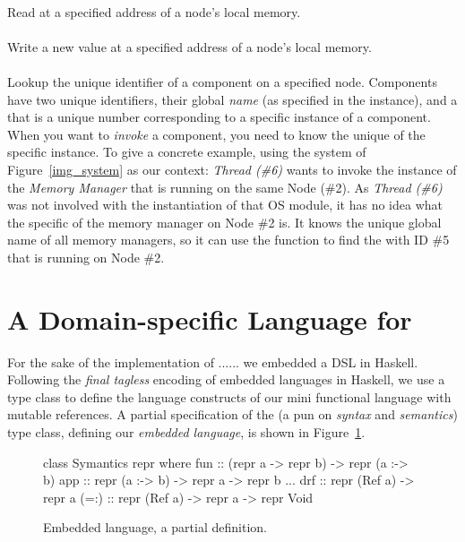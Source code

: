 \paragraph{}
Read at a specified address of a node's local memory.
\paragraph{}
Write a new value at a specified address of a node's local memory.
\paragraph{}
Lookup the unique identifier of a component on a specified node.
Components have two unique identifiers, their global \emph{name} (as specified in the  instance), and a  that
is a unique number corresponding to a specific instance of a component.
When you want to \emph{invoke} a component, you need to know the unique  of the specific instance.
To give a concrete example, using the system of Figure~\ref{img_system} as our context: \emph{Thread (\#6)} wants to invoke the instance of the \emph{Memory Manager} that is running on the same Node (\#2).
As \emph{Thread (\#6)} was not involved with the instantiation of that OS module, it has no idea what the specific  of the memory manager on Node \#2 is.
It knows the unique global name of all memory managers, so it can use the  function to find the  with ID \#5 that is running on Node \#2.

\section{A Domain-specific Language for \soosim}
\label{sec:dsl}

For the sake of the implementation of ...... we embedded a DSL in Haskell. 
Following the \emph{final tagless} \cite{final_tagless_embedding} encoding of embedded languages in Haskell, we use a type class to define the language constructs of our mini functional language with mutable references.
A partial specification of the  (a pun on \emph{syntax} and \emph{semantics}) type class, defining our \emph{embedded language}, is shown in Figure~\ref{fig:embedded_language_interface}.

\begin{figure}
\centering
\begin{code}
class Symantics repr where
  fun  :: (repr a -> repr b) -> repr (a :-> b)
  app  :: repr (a :-> b) -> repr a -> repr b
  ...
  drf   :: repr (Ref a) -> repr a
  (=:)  :: repr (Ref a) -> repr a -> repr Void
\end{code}
\caption{Embedded language, a partial definition.}
\label{fig:embedded_language_interface}
\end{figure}

